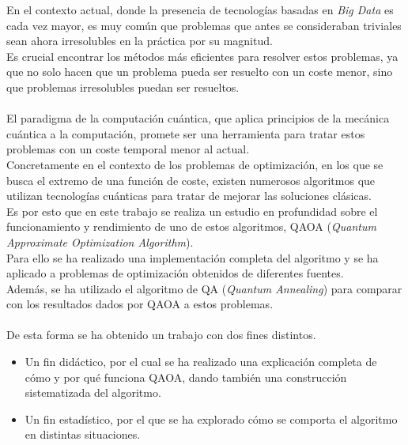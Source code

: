 En el contexto actual, donde la presencia de tecnologías basadas en \textit{Big Data} es cada vez mayor, es muy común que problemas que antes se consideraban triviales sean ahora irresolubles en la práctica por su magnitud.
\\
Es crucial encontrar los métodos más eficientes para resolver estos problemas, ya que no solo hacen que un problema pueda ser resuelto con un coste menor, sino que problemas irresolubles puedan ser resueltos.
\\\\
El paradigma de la computación cuántica, que aplica principios de la mecánica cuántica a la computación, promete ser una herramienta para tratar estos problemas con un coste temporal menor al actual.
\\
Concretamente en el contexto de los problemas de optimización, en los que se busca el extremo de una función de coste, existen numerosos algoritmos que utilizan tecnologías cuánticas para tratar de mejorar las soluciones clásicas.
\\
Es por esto que en este trabajo se realiza un estudio en profundidad sobre el funcionamiento y rendimiento de uno de estos algoritmos, QAOA (\textit{Quantum Approximate Optimization Algorithm})\@.
\\
Para ello se ha realizado una implementación completa del algoritmo y se ha aplicado a problemas de optimización obtenidos de diferentes fuentes.
\\
Además, se ha utilizado el algoritmo de QA (\textit{Quantum Annealing}) para comparar con los resultados dados por QAOA a estos problemas.
\\\\
De esta forma se ha obtenido un trabajo con dos fines distintos.
\begin{itemize}
\item Un fin didáctico, por el cual se ha realizado una explicación completa de cómo y por qué funciona QAOA\@, dando también una construcción sistematizada del algoritmo.

\item Un fin estadístico, por el que se ha explorado cómo se comporta el algoritmo en distintas situaciones.
\end{itemize}


